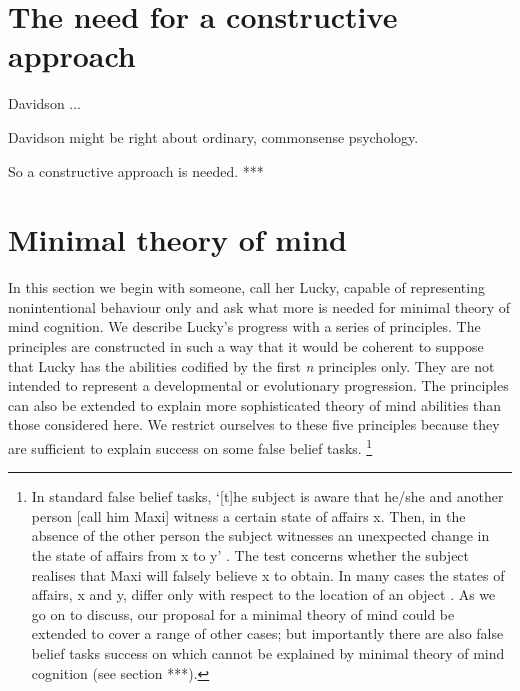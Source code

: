 \documentclass[12pt,\papersize]{extarticle}
\begin{document}




\section{The need for a constructive approach}
Davidson ...


Davidson might be right about ordinary, commonsense psychology.

So a constructive approach is needed. ***





\section{Minimal theory of mind}

In this section we begin with someone, call her Lucky, capable  of representing nonintentional behaviour only and ask what more is needed for minimal theory of mind cognition.  We describe Lucky’s progress with a series of principles. The principles are constructed in such a way that it would be coherent to suppose that Lucky has the abilities codified by the first \textit{n} principles only. They are not intended to represent a developmental or evolutionary progression.  The principles can also be extended to explain more sophisticated theory of mind abilities than those considered here.  We restrict ourselves to these five principles because they are sufficient to explain success on some false belief tasks.%
\footnote{
In standard false belief tasks, `[t]he subject is aware that he/she and another person [call him Maxi] witness a certain state of affairs x.  Then, in the absence of the other person the subject witnesses an unexpected change in the state of affairs from x to y' \citep[][p.\ 106]{en_89}.  The test concerns whether the subject realises that Maxi will falsely believe x to obtain.  In many cases the states of affairs, x and y, differ only with respect to the location of an object \citep[e.g.][]{en_1092, en_1208, en_1824}. 
As we go on to discuss, our proposal for a minimal theory of mind could be extended to cover a range of other cases;
but importantly there are also false belief tasks success on which cannot be explained by minimal theory of mind cognition (see section ***).
}
\end{document}
